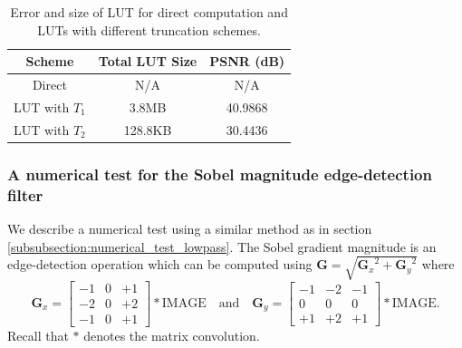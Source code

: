 \documentclass[12pt]{amsart}
\theoremstyle{definition}
\theoremstyle{remark}
\numberwithin{thm}{section}
\newcommand{\IMAGE}{\text{IMAGE}}
\begin{document}
\begin{center}
\begin{table}
	 
    \begin{tabular}{ | c | c| c |}
    \hline
    Scheme & Total LUT Size & PSNR (dB) \\ \hline
    Direct & N/A & N/A  \\ \hline
    LUT with $T_1$ & 3.8MB & 40.9868 \\ \hline
    LUT with $T_2$ & 128.8KB & 30.4436 \\ \hline   
    \end{tabular}
    \bigskip
    
    \caption{Error and size of LUT for direct computation and LUTs with different truncation schemes.}
     \label{tbl:high_pass}
\end{table}
\end{center}

\subsubsection{A numerical test for the Sobel magnitude edge-detection filter}\label{subsubsection:sobel}
We describe a numerical test using a similar method as in section \ref{subsubsection:numerical_test_lowpass}.
The Sobel gradient magnitude is an edge-detection operation \cite{Sob68} which can be computed using
$\mathbf{G} = \sqrt{ {\mathbf{G}_x}^2 + {\mathbf{G}_y}^2 }$
where
$$\mathbf{G}_x = \begin{bmatrix} 
 -1 & 0 & +1  \\
-2 & 0 & +2 \\
-1 & 0 & +1 
\end{bmatrix} * \IMAGE
\quad
\mbox{and}
\quad   
\mathbf{G}_y = \begin{bmatrix} 
-1 & -2 & -1 \\
 0 & 0 & 0 \\
+1 & +2 & +1
\end{bmatrix} * \IMAGE.$$
Recall that $*$ denotes the matrix convolution.
\end{document}
